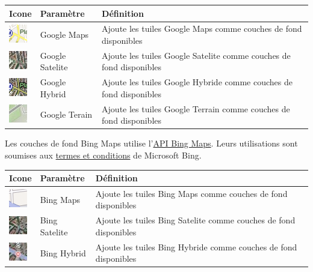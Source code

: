 \documentclass[letterpaper,10pt,french]{sphinxmanual}
\begin{document}
\begin{tabulary}{\linewidth}{|L|L|L|}
\hline

\textbf{Icone}
 & 
\textbf{Paramètre}
 & 
\textbf{Définition}
\\
\hline
\includegraphics{gmap-layer-icon.png}
 & 
Google Maps
 & 
Ajoute les tuiles Google Maps comme couches de fond disponibles
\\
\hline
\includegraphics{gsat-layer-icon.png}
 & 
Google Satelite
 & 
Ajoute les tuiles Google Satelite comme couches de fond disponibles
\\
\hline
\includegraphics{ghyb-layer-icon.png}
 & 
Google Hybrid
 & 
Ajoute les tuiles Google Hybride comme couches de fond disponibles
\\
\hline
\includegraphics{gter-layer-icon.png}
 & 
Google Terain
 & 
Ajoute les tuiles Google Terrain comme couches de fond disponibles
\\
\hline\end{tabulary}


Les couches de fond Bing Maps utilise l'\href{http://www.microsoft.com/maps/}{API Bing Maps}. Leurs utilisations sont soumises aux \href{http://www.microsoft.com/maps/product/terms.html/}{termes et conditions} de Microsoft Bing.

\begin{tabulary}{\linewidth}{|L|L|L|}
\hline

\textbf{Icone}
 & 
\textbf{Paramètre}
 & 
\textbf{Définition}
\\
\hline
\includegraphics{bstr-layer-icon.png}
 & 
Bing Maps
 & 
Ajoute les tuiles Bing Maps comme couches de fond disponibles
\\
\hline
\includegraphics{bsat-layer-icon.png}
 & 
Bing Satelite
 & 
Ajoute les tuiles Bing Satelite comme couches de fond disponibles
\\
\hline
\includegraphics{bhyb-layer-icon.png}
 & 
Bing Hybrid
 & 
Ajoute les tuiles Bing Hybride comme couches de fond disponibles
\\
\hline\end{tabulary}
\end{document}
